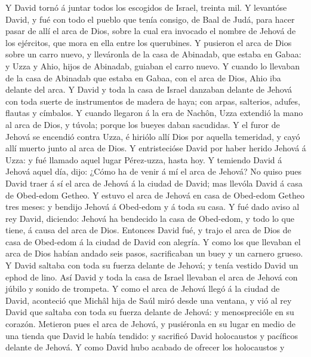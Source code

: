  Y David tornó á juntar todos los escogidos de Israel,
treinta mil.  Y levantóse David, y fué con todo el pueblo
que tenía consigo, de Baal de Judá, para hacer pasar de allí el arca de
Dios, sobre la cual era invocado el nombre de Jehová de los ejércitos,
que mora en ella entre los querubines.  Y pusieron el arca
de Dios sobre un carro nuevo, y lleváronla de la casa de Abinadab, que
estaba en Gabaa: y Uzza y Ahio, hijos de Abinadab, guiaban el carro
nuevo.  Y cuando lo llevaban de la casa de Abinadab que
estaba en Gabaa, con el arca de Dios, Ahio iba delante del arca.
 Y David y toda la casa de Israel danzaban delante de
Jehová con toda suerte de instrumentos de madera de haya; con arpas,
salterios, adufes, flautas y címbalos.  Y cuando llegaron
á la era de Nachôn, Uzza extendió la mano al arca de Dios, y túvola;
porque los bueyes daban sacudidas.  Y el furor de Jehová
se encendió contra Uzza, é hiriólo allí Dios por aquella temeridad, y
cayó allí muerto junto al arca de Dios.  Y entristecióse
David por haber herido Jehová á Uzza: y fué llamado aquel lugar
Pérez-uzza, hasta hoy.  Y temiendo David á Jehová aquel
día, dijo: ¿Cómo ha de venir á mí el arca de Jehová?  No
quiso pues David traer á sí el arca de Jehová á la ciudad de David; mas
llevóla David á casa de Obed-edom Getheo.  Y estuvo el
arca de Jehová en casa de Obed-edom Getheo tres meses: y bendijo Jehová
á Obed-edom y á toda su casa.  Y fué dado aviso al rey
David, diciendo: Jehová ha bendecido la casa de Obed-edom, y todo lo que
tiene, á causa del arca de Dios. Entonces David fué, y trajo el arca de
Dios de casa de Obed-edom á la ciudad de David con alegría.
 Y como los que llevaban el arca de Dios habían andado
seis pasos, sacrificaban un buey y un carnero grueso.  Y
David saltaba con toda su fuerza delante de Jehová; y tenía vestido
David un ephod de lino.  Así David y toda la casa de
Israel llevaban el arca de Jehová con júbilo y sonido de trompeta.
 Y como el arca de Jehová llegó á la ciudad de David,
aconteció que Michâl hija de Saúl miró desde una ventana, y vió al rey
David que saltaba con toda su fuerza delante de Jehová: y menosprecióle
en su corazón.  Metieron pues el arca de Jehová, y
pusiéronla en su lugar en medio de una tienda que David le había
tendido: y sacrificó David holocaustos y pacíficos delante de Jehová.
 Y como David hubo acabado de ofrecer los holocaustos y
